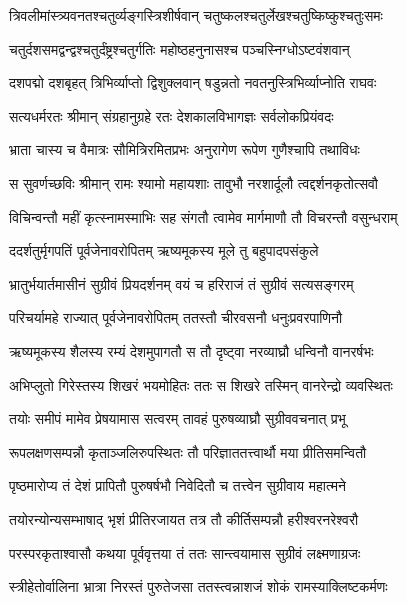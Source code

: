 \twolineshloka
{त्रिवलीमांस्त्र्यवनतश्चतुर्व्यङ्गस्त्रिशीर्षवान्}
{चतुष्कलश्चतुर्लेखश्चतुष्किष्कुश्चतुःसमः} %

\twolineshloka
{चतुर्दशसमद्वन्द्वश्चतुर्दंष्ट्रश्चतुर्गतिः}
{महोष्ठहनुनासश्च पञ्चस्निग्धोऽष्टवंशवान्} %

\twolineshloka
{दशपद्मो दशबृहत् त्रिभिर्व्याप्तो द्विशुक्लवान्}
{षडुन्नतो नवतनुस्त्रिभिर्व्याप्नोति राघवः} %

\twolineshloka
{सत्यधर्मरतः श्रीमान् संग्रहानुग्रहे रतः}
{देशकालविभागज्ञः सर्वलोकप्रियंवदः} %

\twolineshloka
{भ्राता चास्य च वैमात्रः सौमित्रिरमितप्रभः}
{अनुरागेण रूपेण गुणैश्चापि तथाविधः} %

\twolineshloka
{स सुवर्णच्छविः श्रीमान् रामः श्यामो महायशाः}
{तावुभौ नरशार्दूलौ त्वद्दर्शनकृतोत्सवौ} %

\twolineshloka
{विचिन्वन्तौ महीं कृत्स्नामस्माभिः सह संगतौ}
{त्वामेव मार्गमाणौ तौ विचरन्तौ वसुन्धराम्} %

\twolineshloka
{ददर्शतुर्मृगपतिं पूर्वजेनावरोपितम्}
{ऋष्यमूकस्य मूले तु बहुपादपसंकुले} %

\twolineshloka
{भ्रातुर्भयार्तमासीनं सुग्रीवं प्रियदर्शनम्}
{वयं च हरिराजं तं सुग्रीवं सत्यसङ्गरम्} %

\twolineshloka
{परिचर्यामहे राज्यात् पूर्वजेनावरोपितम्}
{ततस्तौ चीरवसनौ धनुःप्रवरपाणिनौ} %

\twolineshloka
{ऋष्यमूकस्य शैलस्य रम्यं देशमुपागतौ}
{स तौ दृष्ट्वा नरव्याघ्रौ धन्विनौ वानरर्षभः} %

\twolineshloka
{अभिप्लुतो गिरेस्तस्य शिखरं भयमोहितः}
{ततः स शिखरे तस्मिन् वानरेन्द्रो व्यवस्थितः} %

\twolineshloka
{तयोः समीपं मामेव प्रेषयामास सत्वरम्}
{तावहं पुरुषव्याघ्रौ सुग्रीववचनात् प्रभू} %

\twolineshloka
{रूपलक्षणसम्पन्नौ कृताञ्जलिरुपस्थितः}
{तौ परिज्ञाततत्त्वार्थौ मया प्रीतिसमन्वितौ} %

\twolineshloka
{पृष्ठमारोप्य तं देशं प्रापितौ पुरुषर्षभौ}
{निवेदितौ च तत्त्वेन सुग्रीवाय महात्मने} %

\twolineshloka
{तयोरन्योन्यसम्भाषाद् भृशं प्रीतिरजायत}
{तत्र तौ कीर्तिसम्पन्नौ हरीश्वरनरेश्वरौ} %

\twolineshloka
{परस्परकृताश्वासौ कथया पूर्ववृत्तया}
{तं ततः सान्त्वयामास सुग्रीवं लक्ष्मणाग्रजः} %

\twolineshloka
{स्त्रीहेतोर्वालिना भ्रात्रा निरस्तं पुरुतेजसा}
{ततस्त्वन्नाशजं शोकं रामस्याक्लिष्टकर्मणः} %

